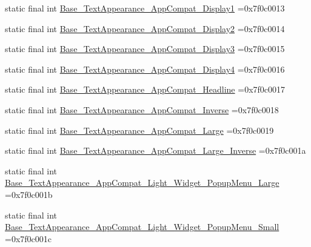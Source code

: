 \begin{DoxyCompactItemize}
\item 
static final int \mbox{\hyperlink{classbr_1_1unb_1_1cic_1_1mp_1_1marketmaster_1_1test_1_1R_1_1style_ab2b65d5e1484a5749e7c13c63fb80c4e}{Base\+\_\+\+Text\+Appearance\+\_\+\+App\+Compat\+\_\+\+Display1}} =0x7f0c0013
\item 
static final int \mbox{\hyperlink{classbr_1_1unb_1_1cic_1_1mp_1_1marketmaster_1_1test_1_1R_1_1style_ab5ed39713b494f16fa3738e92731bd1a}{Base\+\_\+\+Text\+Appearance\+\_\+\+App\+Compat\+\_\+\+Display2}} =0x7f0c0014
\item 
static final int \mbox{\hyperlink{classbr_1_1unb_1_1cic_1_1mp_1_1marketmaster_1_1test_1_1R_1_1style_a57b140372ee361039f1122755e0f842e}{Base\+\_\+\+Text\+Appearance\+\_\+\+App\+Compat\+\_\+\+Display3}} =0x7f0c0015
\item 
static final int \mbox{\hyperlink{classbr_1_1unb_1_1cic_1_1mp_1_1marketmaster_1_1test_1_1R_1_1style_a79ccaed2f7701572bf4cf1a40a3f6c30}{Base\+\_\+\+Text\+Appearance\+\_\+\+App\+Compat\+\_\+\+Display4}} =0x7f0c0016
\item 
static final int \mbox{\hyperlink{classbr_1_1unb_1_1cic_1_1mp_1_1marketmaster_1_1test_1_1R_1_1style_a99b836e4f75e09d11dafc97cf5add8ae}{Base\+\_\+\+Text\+Appearance\+\_\+\+App\+Compat\+\_\+\+Headline}} =0x7f0c0017
\item 
static final int \mbox{\hyperlink{classbr_1_1unb_1_1cic_1_1mp_1_1marketmaster_1_1test_1_1R_1_1style_ad81e2c542f5987d41a296a9acf89a935}{Base\+\_\+\+Text\+Appearance\+\_\+\+App\+Compat\+\_\+\+Inverse}} =0x7f0c0018
\item 
static final int \mbox{\hyperlink{classbr_1_1unb_1_1cic_1_1mp_1_1marketmaster_1_1test_1_1R_1_1style_affc0bb1f623f594c8fd843f53e6504f3}{Base\+\_\+\+Text\+Appearance\+\_\+\+App\+Compat\+\_\+\+Large}} =0x7f0c0019
\item 
static final int \mbox{\hyperlink{classbr_1_1unb_1_1cic_1_1mp_1_1marketmaster_1_1test_1_1R_1_1style_ac21d8b2d636b76a8066f86e143776b34}{Base\+\_\+\+Text\+Appearance\+\_\+\+App\+Compat\+\_\+\+Large\+\_\+\+Inverse}} =0x7f0c001a
\item 
static final int \mbox{\hyperlink{classbr_1_1unb_1_1cic_1_1mp_1_1marketmaster_1_1test_1_1R_1_1style_ad6e3726cf8765a56d3e021780f838f4c}{Base\+\_\+\+Text\+Appearance\+\_\+\+App\+Compat\+\_\+\+Light\+\_\+\+Widget\+\_\+\+Popup\+Menu\+\_\+\+Large}} =0x7f0c001b
\item 
static final int \mbox{\hyperlink{classbr_1_1unb_1_1cic_1_1mp_1_1marketmaster_1_1test_1_1R_1_1style_aee78c4824ddfd65856ce7314c6ccb1ae}{Base\+\_\+\+Text\+Appearance\+\_\+\+App\+Compat\+\_\+\+Light\+\_\+\+Widget\+\_\+\+Popup\+Menu\+\_\+\+Small}} =0x7f0c001c

\end{DoxyCompactItemize}
